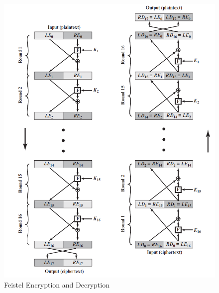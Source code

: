 \documentclass{article}
\begin{document}
\begin{figure}[h]
    \centering
    \includegraphics[width=\textwidth]{feistel.png}
    \caption{Feistel Encryption and Decryption \cite{feistel}}
    \label{fig:feistel}
\end{figure}
\end{document}
